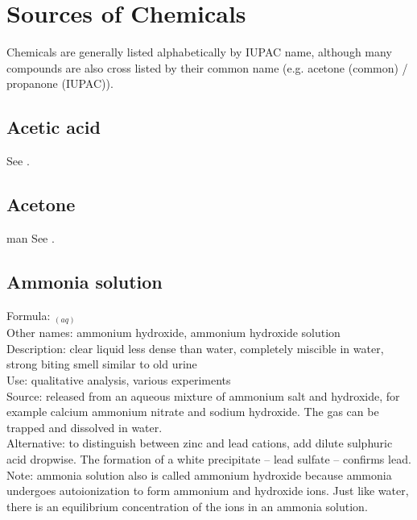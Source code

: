 \section{Sources of Chemicals}
\label{cha:sourcesofchemicals}

Chemicals are generally listed alphabetically by IUPAC name, 
although many compounds are also cross listed by their common name (e.g. 
acetone (common) / propanone (IUPAC)).

\subsection*{Acetic acid}
See .
\subsection*{Acetone}man
See .
\subsection*{Ammonia solution}
\label{sec:ammoniasol}
Formula: $_{(aq)}$\\
Other names: ammonium hydroxide, 
ammonium hydroxide solution\\
Description: clear liquid less dense than water, 
completely miscible in water, 
strong biting smell similar to old urine\\
Use: qualitative analysis, various experiments\\
Source: released from an aqueous mixture of ammonium salt and hydroxide, 
for example calcium ammonium nitrate and sodium hydroxide. 
The gas can be trapped and dissolved in water.\\
Alternative: to distinguish between zinc and lead cations, 
add dilute sulphuric acid dropwise. 
The formation of a white precipitate -- lead sulfate -- confirms lead.
Note: ammonia solution also is called ammonium hydroxide 
because ammonia undergoes autoionization to form ammonium and hydroxide ions. 
Just like water, 
there is an equilibrium concentration of the ions in an ammonia solution.
